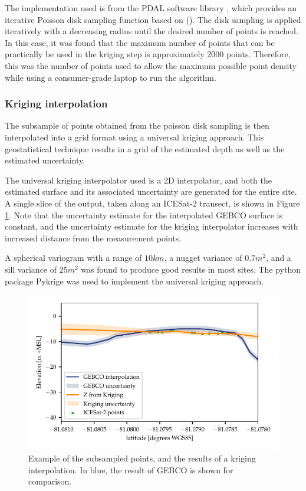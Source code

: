 The implementation used is from the PDAL software library \parencite{howard_butler_2022_6369164}, which provides an iterative Poisson disk sampling function based on \citeauthor{McCool1992} (\citeyear{McCool1992}). The disk sampling is applied iteratively with a decreasing radius until the desired number of points is reached. In this case, it was found that the maximum number of points that can be practically be used in the kriging step is approximately 2000 points. Therefore, this was the number of points used to allow the maximum possible point density while using a consumer-grade laptop to run the algorithm. 

\subsubsection{Kriging interpolation}
The subsample of points obtained from the poisson disk sampling is then interpolated into a grid format using a universal kriging approach. This geostatistical technique results in a grid of the estimated depth as well as the estimated uncertainty. 

The universal kriging interpolator used is a 2D interpolator, and both the estimated surface and its associated uncertainty are generated for the entire site. A single slice of the output, taken along an ICESat-2 transect, is shown in Figure \ref{fig:kriging-interpolator}. Note that the uncertainty estimate for the interpolated GEBCO surface is constant, and the uncertainty estimate for the kriging interpolator increases with increased distance from the measurement points. 

A spherical variogram with a range of $10 km$, a nugget variance of $0.7 m^2$, and a sill variance of $25 m^2$ was found to produce good results in most sites. The python package Pykrige \parencite{benjamin_murphy_2021_5380342} was used to implement the universal kriging approach. 

\begin{figure}[h]
    \centering
    \includegraphics[]{figures/methodology-kriging-output.pdf}
    \caption{Example of the subsampled points, and the results of a kriging interpolation. In blue, the result of GEBCO is shown for comparison.}
    \label{fig:kriging-interpolator}
\end{figure}


